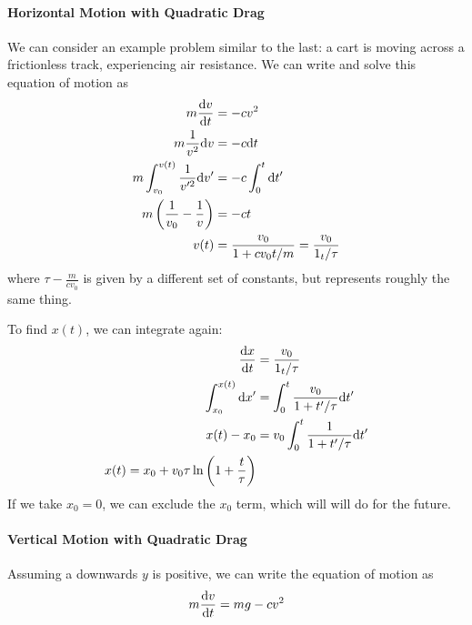 \documentclass[a4paper]{article}
\begin{document}
\paragraph{Horizontal Motion with Quadratic Drag}
We can consider an example problem similar to the last: a cart is moving
across a frictionless track, experiencing air resistance. We can write and solve
this equation of motion as
\begin{align*}
    m\frac{\mathrm{d} v}{\mathrm{d} t} &= -cv^2\\
    m\frac{1}{v^2}\mathrm{d} v &= -c\mathrm{d} t\\
    m\int_{v_0}^{v(t)}\frac{1}{v'^2}\mathrm{d} v' &=
        -c\int_{0}^{t}\mathrm{d} t'\\
    m\left(\frac{1}{v_0}-\frac{1}{v}\right)&=-ct\\
    v(t) &= \frac{v_0}{1+cv_0t/m} = \frac{v_0}{1_t/\tau}
\end{align*}
where $\tau - \frac{m}{cv_0}$ is given by a different set of constants, but
represents roughly the same thing.

To find $x(t)$, we can integrate again:
\begin{align*}
    \frac{\mathrm{d} x}{\mathrm{d} t} &= \frac{v_0}{1_t/\tau}\\
    \int_{x_0}^{x(t)}\mathrm{d} x' &= \int_{0}^{t}\frac{v_0}{1+t'/\tau}\mathrm{d} t'\\
    x(t)-x_0 &= v_0\int_0^t \frac{1}{1+t'/\tau}\mathrm{d} t'\\
    x(t) = x_0 + v_0\tau\ln\left(1+\frac{t}{\tau}\right)
\end{align*}
If we take $x_0=0$, we can exclude the $x_0$ term, which will will do for the
future.

\paragraph{Vertical Motion with Quadratic Drag}
Assuming a downwards $y$ is positive, we can write the equation of motion as 
\[
    m\frac{\mathrm{d} v}{\mathrm{d} t} = mg-cv^2    
\]
\end{document}
